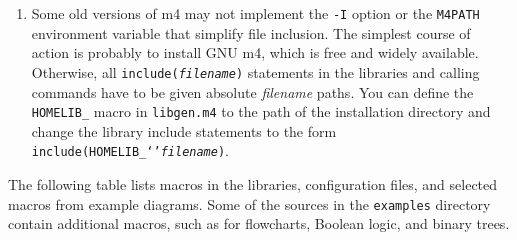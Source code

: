 \begin{enumerate}
\iffalse
\item
\bflistitem{\PSTricks anomaly}{anomaly}
 If you are using \PSTricks and
  you get the error message {\tt Graphics parameter `noCurrentPoint'
  not defined..} then your version of \PSTricks is older than
  August 2010.  You can do the following:
\begin{enumerate}
\item Update your \PSTricks package.
\item Instead, comment out the second definition of {\tt M4PatchPSTricks} in
  {\tt pstricks.m4}.  The first definition works for some older
  \PSTricks distributions.
\item Insert {\tt define(`M4PatchPSTricks',)} immediately after the
   {\tt .PS} line of your diagram.
  This change prevents the line
  \verb|\psset{noCurrentPoint}| from being added to the {\tt .tex}
  code for the diagram.  This line is a workaround for a ``feature''
  of the current \PSTricks \verb|\psbezier| command that changes its
  behaviour within the \verb|\pscustom| environment.  This situation
  occurs rarely and so the line is unnecessary for many diagrams.
\item For very old versions of \PSTricks such as pstricks97, disable the
  workaround totally by changing the second definition in {\tt pstricks.m4}
  to {\tt define(`M4PatchPSTricks',)}.  Undo the change if you later update
  \PSTricks.
  \end{enumerate}
\fi

\item
{}\label{Mfourerror:}
  Some old versions of m4 may not implement
  the {\tt -I} option or the {\tt M4PATH} environment variable that
  simplify file inclusion.
  The simplest course of action is probably to install GNU m4, which is
  free and widely available. 
  Otherwise, all {\tt include({\sl filename})} statements in the libraries and
  calling commands have to be given absolute {\sl filename} paths. 
  You can define the {\tt HOMELIB\_} macro in {\tt libgen.m4} to the
  path of the installation directory and change the library
  include statements to the form {\tt include(HOMELIB\_`'{\sl filename})}.

\end{enumerate}

\label{defines}
The following table lists macros in the libraries, configuration
files, and selected macros from example diagrams.  Some of the sources
in the {\tt examples} directory contain
additional macros, such as for flowcharts, Boolean logic, and binary
trees.

